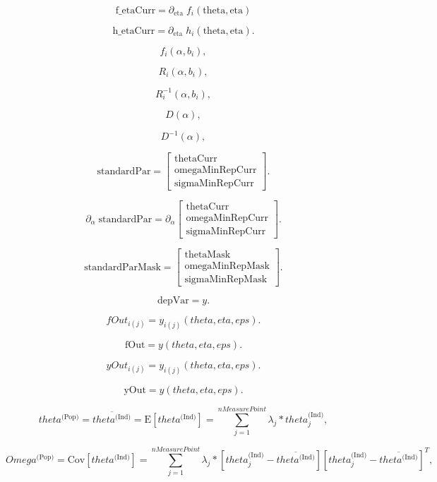 \documentclass{article}
\begin{document}
\[ \mbox{f_etaCurr} = \partial_{\mbox{eta}} \; f_i(\mbox{theta}, \mbox{eta}) \]
\pagebreak

\[ \mbox{h_etaCurr} = \partial_{\mbox{eta}} \; h_i(\mbox{theta}, \mbox{eta}) . \]
\pagebreak

\[ f_i(\alpha, b_i) , \]
\pagebreak

\[ R_i(\alpha, b_i) , \]
\pagebreak

\[ R^{-1}_i(\alpha, b_i) , \]
\pagebreak

\[ D(\alpha) , \]
\pagebreak

\[ D^{-1}(\alpha) , \]
\pagebreak

\[ \mbox{standardPar} = \left[ \begin{array}{c} \mbox{thetaCurr} \\ \mbox{omegaMinRepCurr} \\ \mbox{sigmaMinRepCurr} \end{array} \right] . \]
\pagebreak

\[ \partial_{\alpha} \; \mbox{standardPar} = \partial_{\alpha} \left[ \begin{array}{c} \mbox{thetaCurr} \\ \mbox{omegaMinRepCurr} \\ \mbox{sigmaMinRepCurr} \end{array} \right] . \]
\pagebreak

\[ \mbox{standardParMask} = \left[ \begin{array}{c} \mbox{thetaMask} \\ \mbox{omegaMinRepMask} \\ \mbox{sigmaMinRepMask} \end{array} \right] . \]
\pagebreak

\[ \mbox{depVar} = y . \]
\pagebreak

\[ fOut_{i(j)} = y_{i(j)}(theta, eta, eps) . \]
\pagebreak

\[ \mbox{fOut} = y(theta, eta, eps) . \]
\pagebreak

\[ yOut_{i(j)} = y_{i(j)}(theta, eta, eps) . \]
\pagebreak

\[ \mbox{yOut} = y(theta, eta, eps) . \]
\pagebreak

\[ theta^{\mbox{(Pop)}} = \overline{ theta^{\mbox{(Ind)}} } = \mbox{E}\left[ theta^{\mbox{(Ind)}} \right] = \sum_{j = 1}^{nMeasurePoint} \lambda_j * theta_j^{\mbox{(Ind)}} , \]
\pagebreak

\[ Omega^{\mbox{(Pop)}} = \mbox{Cov}\left[ theta^{\mbox{(Ind)}} \right] = \sum_{j = 1}^{nMeasurePoint} \lambda_j * \left[ theta_j^{\mbox{(Ind)}} - \overline{ theta^{\mbox{(Ind)}} } \right] \left[ theta_j^{\mbox{(Ind)}} - \overline{ theta^{\mbox{(Ind)}} } \right]^T , \]
\pagebreak
\end{document}
